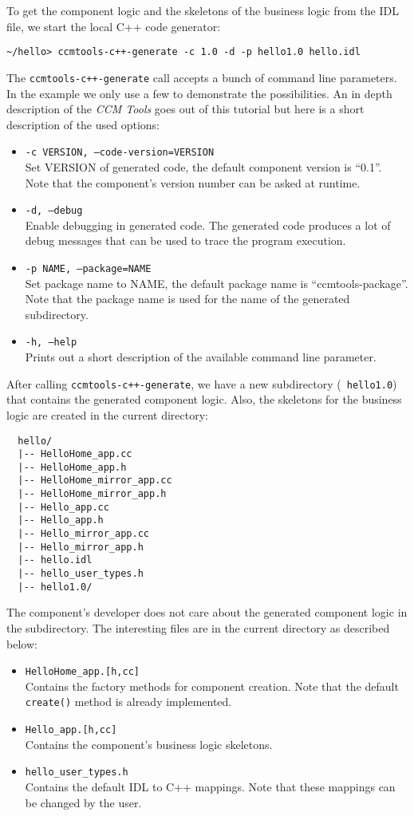 To get the component logic and the skeletons of the business logic from the IDL
file, we start the local C++ code generator:
\begin{verbatim}
~/hello> ccmtools-c++-generate -c 1.0 -d -p hello1.0 hello.idl
\end{verbatim}
The {\tt ccmtools-c++-generate} call accepts a bunch of command line parameters.
In the example we only use a few to demonstrate the possibilities. An in depth
description of the {\it CCM Tools} goes out of this tutorial but here is a short
description of the used options:
\begin{itemize}
\item {\tt -c VERSION, --code-version=VERSION }\\
Set VERSION of generated code, the default component version is ``0.1''. Note
that the component's version number can be asked at runtime.

\item {\tt -d, --debug }\\
Enable debugging in generated code. The generated code produces a lot of debug
messages that can be used to trace the program execution.

\item {\tt -p NAME, --package=NAME}\\
Set package name to NAME, the default package name is ``ccmtools-package''. Note
that the package name is used for the name of the generated subdirectory.

\item {\tt -h, --help}\\
Prints out a short description of the available command line parameter.
\end{itemize}
After calling {\tt ccmtools-c++-generate}, we have a new subdirectory ({\tt
hello1.0}) that contains the generated component logic. Also, the skeletons for
the business logic are created in the current directory:
\begin{verbatim}
  hello/
  |-- HelloHome_app.cc
  |-- HelloHome_app.h
  |-- HelloHome_mirror_app.cc
  |-- HelloHome_mirror_app.h
  |-- Hello_app.cc
  |-- Hello_app.h
  |-- Hello_mirror_app.cc
  |-- Hello_mirror_app.h
  |-- hello.idl
  |-- hello_user_types.h
  |-- hello1.0/
\end{verbatim}
The component's developer does not care about the generated component logic in
the subdirectory. The interesting files are in the current directory as
described below:
\begin{itemize}
\item {\tt HelloHome\_app.[h,cc]} \\
Contains the factory methods for component creation. Note that the default {\tt
create()} method is already implemented.
\item {\tt Hello\_app.[h,cc]} \\
Contains the component's business logic skeletons.
\item {\tt hello\_user\_types.h} \\
Contains the default IDL to C++ mappings. Note that these mappings can be
changed by the user.
\end{itemize}
